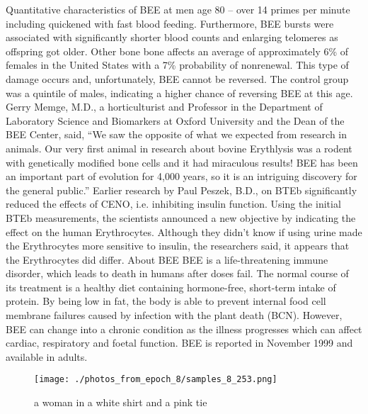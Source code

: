 \documentclass{article}%
\begin{document}
Quantitative characteristics of BEE at men age 80 – over 14 primes per minute including quickened with fast blood feeding. Furthermore, BEE bursts were associated with significantly shorter blood counts and enlarging telomeres as offspring got older.\newline%
Other bone bone affects an average of approximately 6\% of females in the United States with a 7\% probability of nonrenewal. This type of damage occurs and, unfortunately, BEE cannot be reversed. The control group was a quintile of males, indicating a higher chance of reversing BEE at this age.\newline%
Gerry Memge, M.D., a horticulturist and Professor in the Department of Laboratory Science and Biomarkers at Oxford University and the Dean of the BEE Center, said, “We saw the opposite of what we expected from research in animals. Our very first animal in research about bovine Erythlysis was a rodent with genetically modified bone cells and it had miraculous results! BEE has been an important part of evolution for 4,000 years, so it is an intriguing discovery for the general public.”\newline%
Earlier research by Paul Peszek, B.D., on BTEb significantly reduced the effects of CENO, i.e. inhibiting insulin function. Using the initial BTEb measurements, the scientists announced a new objective by indicating the effect on the human Erythrocytes. Although they didn’t know if using urine made the Erythrocytes more sensitive to insulin, the researchers said, it appears that the Erythrocytes did differ.\newline%
About BEE\newline%
BEE is a life{-}threatening immune disorder, which leads to death in humans after doses fail. The normal course of its treatment is a healthy diet containing hormone{-}free, short{-}term intake of protein. By being low in fat, the body is able to prevent internal food cell membrane failures caused by infection with the plant death (BCN). However, BEE can change into a chronic condition as the illness progresses which can affect cardiac, respiratory and foetal function.\newline%
BEE is reported in November 1999 and available in adults.\newline%

%


\begin{figure}[h!]%
\centering%
\texttt{[image: ./photos\_from\_epoch\_8/samples\_8\_253.png]}%
\caption{a woman in a white shirt and a pink tie}%
\end{figure}

%
\end{document}
